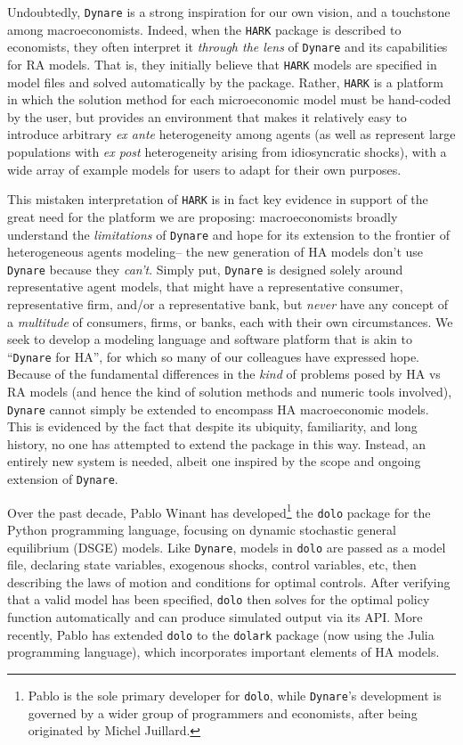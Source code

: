 \documentclass[12pt,pdftex,letterpaper]{article}
\begin{document}
Undoubtedly, \texttt{Dynare} is a strong inspiration for our own vision, and a touchstone among macroeconomists. Indeed, when the \texttt{HARK} package is described to economists, they often interpret it \textit{through the lens} of \texttt{Dynare} and its capabilities for RA models. That is, they initially believe that \texttt{HARK} models are specified in model files and solved automatically by the package. Rather, \texttt{HARK} is a platform in which the solution method for each microeconomic model must be hand-coded by the user, but provides an environment that makes it relatively easy to introduce arbitrary \textit{ex ante} heterogeneity among agents (as well as represent large populations with \textit{ex post} heterogeneity arising from idiosyncratic shocks), with a wide array of example models for users to adapt for their own purposes.

This mistaken interpretation of \texttt{HARK} is in fact key evidence in support of the great need for the platform we are proposing: macroeconomists broadly understand the \textit{limitations} of \texttt{Dynare} and hope for its extension to the frontier of heterogeneous agents modeling-- the new generation of HA models don't use \texttt{Dynare} because they \textit{can't}. Simply put, \texttt{Dynare} is designed solely around representative agent models, that might have a representative consumer, representative firm, and/or a representative bank, but \textit{never} have any concept of a \textit{multitude} of consumers, firms, or banks, each with their own circumstances. We seek to develop a modeling language and software platform that is akin to ``\texttt{Dynare} for HA'', for which so many of our colleagues have expressed hope. Because of the fundamental differences in the \textit{kind} of problems posed by HA vs RA models (and hence the kind of solution methods and numeric tools involved), \texttt{Dynare} cannot simply be extended to encompass HA macroeconomic models. This is evidenced by the fact that despite its ubiquity, familiarity, and long history, no one has attempted to extend the package in this way. Instead, an entirely new system is needed, albeit one inspired by the scope and ongoing extension of \texttt{Dynare}.

Over the past decade, Pablo Winant has developed\footnote{Pablo is the sole primary developer for \texttt{dolo}, while \texttt{Dynare}'s development is governed by a wider group of programmers and economists, after being originated by Michel Juillard.} the \texttt{dolo} package for the Python programming language, focusing on dynamic stochastic general equilibrium (DSGE) models. Like \texttt{Dynare}, models in \texttt{dolo} are passed as a model file, declaring state variables, exogenous shocks, control variables, etc, then describing the laws of motion and conditions for optimal controls. After verifying that a valid model has been specified, \texttt{dolo} then solves for the optimal policy function automatically and can produce simulated output via its API. More recently, Pablo has extended \texttt{dolo} to the \texttt{dolark} package (now using the Julia programming language), which incorporates important elements of HA models.
\end{document}
